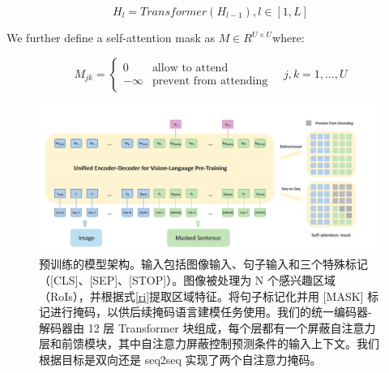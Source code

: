 \documentclass[a4paper]{article}
\begin{document}
\begin{sloppypar}
      \begin{equation}
            H_l = Transformer(H_{l - 1}),l \in [1,L]
            \label{recur}
      \end{equation}


      We further define a self-attention mask as $M \in R^{U \times U}$where:

      \begin{equation}
            M_{jk} =
            \begin{cases}
                  0       & \text{allow to attend}        \\
                  -\infty & \text{prevent from attending}
            \end{cases}
            \quad j,k=1, \ldots, U
            \label{masked}
      \end{equation}

      \newpage

      \begin{figure}[h]
            \includegraphics[scale=0.5]{image}
            \caption{预训练的模型架构。输入包括图像输入、句子输入和三个特殊标记（[CLS]、[SEP]、[STOP]）。图像被处理为 N 个感兴趣区域（RoIs），并根据式\ref{ri}提取区域特征。将句子标记化并用 [MASK] 标记进行掩码，以供后续掩码语言建模任务使用。我们的统一编码器-解码器由 12 层 Transformer 块组成，每个层都有一个屏蔽自注意力层和前馈模块，其中自注意力屏蔽控制预测条件的输入上下文。我们根据目标是双向还是 seq2seq 实现了两个自注意力掩码。}
            \label{procedure}
      \end{figure}



\end{sloppypar}
\end{document}
